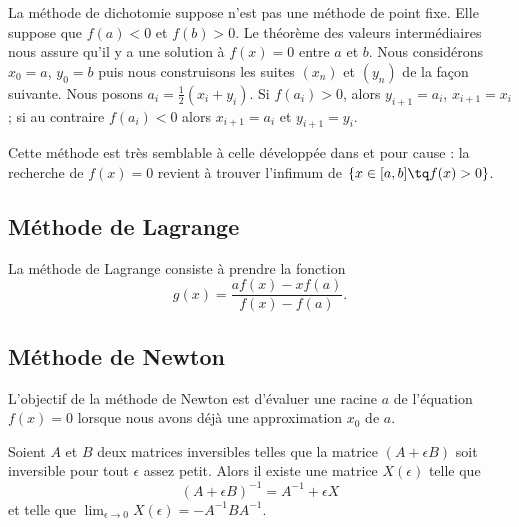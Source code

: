 La méthode de dichotomie suppose n'est pas une méthode de point fixe. Elle suppose que \( f(a)<0\) et \( f(b)>0\). Le théorème des valeurs intermédiaires nous assure qu'il y a une solution à \( f(x)=0\) entre \( a\) et \( b\). Nous considérons \( x_0=a\), \( y_0=b\) puis nous construisons les suites \( (x_n)\) et \( (y_n)\) de la façon suivante. Nous posons \( a_i=\frac{ 1 }{2}(x_i+y_i)\). Si \( f(a_i)>0\), alors \( y_{i+1}=a_i\), \( x_{i+1}=x_i\); si au contraire \( f(a_i)<0\) alors \( x_{i+1}=a_i\) et \( y_{i+1}=y_i\).

Cette méthode est très semblable à celle développée dans %
et pour cause : la recherche de \( f(x)=0\) revient à trouver l'infimum de \( \{ x\in\mathopen[ a , b \mathclose]\tq f(x)>0 \}\).

\subsection{Méthode de Lagrange}

La méthode de Lagrange consiste à prendre la fonction
\begin{equation}
    g(x)=\frac{ af(x)-xf(a) }{ f(x)-f(a) }.
\end{equation}

\subsection{Méthode de Newton}

L'objectif de la méthode de Newton est d'évaluer une racine \( a\) de l'équation \( f(x)=0\) lorsque nous avons déjà une approximation \( x_0\) de \( a\).

\begin{lemma}       \label{LemXdObnV}
    Soient \( A\) et \( B\) deux matrices inversibles telles que la matrice \( (A+\epsilon B)\) soit inversible pour tout \( \epsilon\) assez petit. Alors il existe une matrice \( X(\epsilon)\) telle que
    \begin{equation}
        (A+\epsilon B)^{-1}=A^{-1}+\epsilon X
    \end{equation}
    et telle que \( \lim_{\epsilon\to 0}X(\epsilon)=-A^{-1} BA^{-1}\).
\end{lemma}

